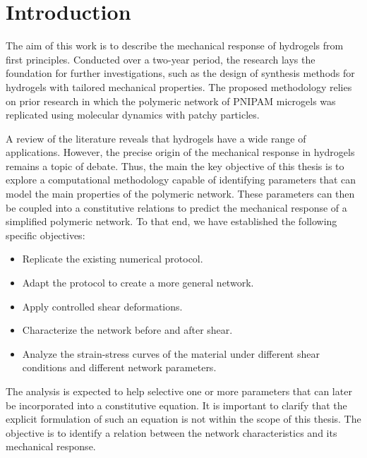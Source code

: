 \chapter{Introduction}\label{ch1:Intro}



The aim of this work is to describe the mechanical response of hydrogels from first principles. 
Conducted over a two-year period, the research lays the foundation for further investigations, such as the design of synthesis methods for hydrogels with tailored mechanical properties. 
The proposed methodology relies on prior research in which the polymeric network of PNIPAM microgels was replicated using molecular dynamics with patchy particles.

A review of the literature reveals that hydrogels have a wide range of applications.
However, the precise origin of the mechanical response in hydrogels remains a topic of debate.
Thus, the main the key objective of this thesis is to explore a computational methodology capable of identifying parameters that can model the main properties of the polymeric network. 
These parameters can then be coupled into a constitutive relations to predict the mechanical response of a simplified polymeric network.
To that end, we have established the following specific objectives:
\begin{itemize}
    \item Replicate the existing numerical protocol.
    \item Adapt the protocol to create a more general network.
    \item Apply controlled shear deformations.
    \item Characterize the network before and after shear.
    \item Analyze the strain-stress curves of the material under different shear conditions and different network parameters.
\end{itemize}
The analysis is expected to help selective one or more parameters that can later be incorporated into a constitutive equation.
It is important to clarify that the explicit formulation of such an equation is not within the scope of this thesis. 
The objective is to identify a relation between the network characteristics and its mechanical response.

